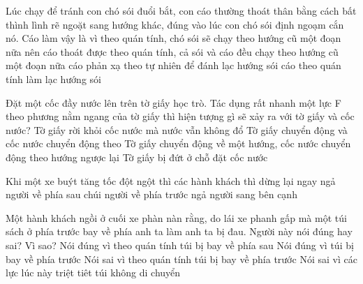 \begin{ex}%
Lúc chạy để tránh con chó sói đuổi bắt, con cáo thường thoát thân bằng cách bất thình lình rẽ ngoặt sang hướng khác, đúng vào lúc con chó sói định ngoạm cắn nó. Cáo làm vậy là vì
\choice
{\True theo quán tính, chó sói sẽ chạy theo hướng cũ một đoạn nữa nên cáo thoát được}
{theo quán tính, cả sói và cáo đều chạy theo hướng cũ một đoạn nữa}
{cáo phản xạ theo tự nhiên để đánh lạc hướng sói}
{cáo theo quán tính làm lạc hướng sói}
  \end{ex}
\begin{ex}%
Đặt một cốc đầy nước lên trên tờ giấy học trò. Tác dụng rất nhanh một lực F theo phương nằm ngang của tờ giấy thì hiện tượng gì sẽ xảy ra với tờ giấy và cốc nước?
\choice
{\True Tờ giấy rời khỏi cốc nước mà nước vẫn không đổ}
{Tờ giấy chuyển động và cốc nước chuyển động theo}
{Tờ giấy chuyển động về một hướng, cốc nước chuyển động theo hướng ngược lại}
{Tờ giấy bị đứt ở chỗ đặt cốc nước}
 \end{ex}
\begin{ex}%
Khi một xe buýt tăng tốc đột ngột thì các hành khách thì 
\choice
{dừng lại ngay}
{\True ngả người về phía sau}
{chúi người về phía trước}
{ngả người sang bên cạnh}
 \end{ex}
\begin{ex}%
Một hành khách ngồi ở cuối xe phàn nàn rằng, do lái xe phanh gấp mà một túi sách ở phía trước bay về phía anh ta làm anh ta bị đau. Người này nói đúng hay sai? Vì sao?
\choice
{Nói đúng vì theo quán tính túi bị bay về phía sau}
{Nói đúng vì túi bị bay về phía trước}
{\True Nói sai vì theo quán tính túi bị bay về phía trước}
{Nói sai vì các lực lúc này triệt tiêt túi không di chuyển}
  \end{ex}
